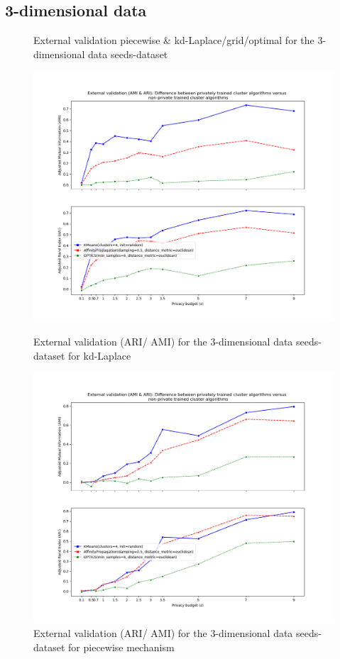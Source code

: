 \subsection{3-dimensional data}
\begin{figure}[H]
    \caption{External validation piecewise \& kd-Laplace/grid/optimal for the 3-dimensional data seeds-dataset}
    \centering
    \begin{minipage}[c]{0.60\textwidth}
        \includegraphics[width=1\textwidth]{Results/3d-laplace-optimal-truncated/seeds-dataset/ami-and-ari.png}
        \caption{External validation (ARI/ AMI) for the 3-dimensional data seeds-dataset for kd-Laplace}
        \label{fig:external-validation-seeds-dataset_comparison_3d-laplace}
    \end{minipage}
    \begin{minipage}[c]{0.60\textwidth}
        \includegraphics[width=1\textwidth]{Results/3d-piecewise/seeds-dataset/ami-and-ari.png}
        \caption{External validation (ARI/ AMI) for the 3-dimensional data seeds-dataset for piecewise mechanism}
        \label{fig:external-validation-seeds-dataset_comparison_3d-piecewise}
    \end{minipage}
\end{figure}
